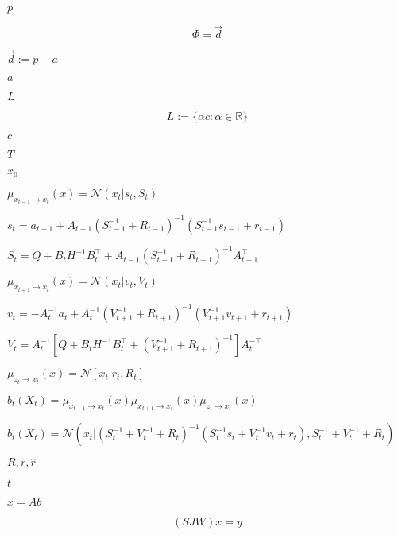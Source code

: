 \documentclass{article}
\begin{document}
$p$
\pagebreak

\[ \Phi = \vec{d} \]
\pagebreak

$\vec{d}:=p - a$
\pagebreak

$a$
\pagebreak

$L$
\pagebreak

\[ L:=\{\alpha c : \alpha\in\mathbb{R}\} \]
\pagebreak

$c$
\pagebreak

$T$
\pagebreak

$x_0$
\pagebreak

$ \mu_{x_{t-1}\rightarrow x_t}(x)=\mathcal{N}(x_t|s_t,S_t) $
\pagebreak

$ s_t=a_{t-1}\!+\!A_{t-1}(S_{t-1}^{-1}\!+\!R_{t-1})^{-1}(S_{t-1}^{-1}s_{t-1}\!+\!r_{t-1}) $
\pagebreak

$ S_t=Q+B_tH^{-1}B_t^{\!\top\!} + A_{t-1}(S_{t-1}^{-1}+R_{t-1})^{-1}A_{t-1}^{\!\top\!} $
\pagebreak

$ \mu_{x_{t+1}\rightarrow x_t}(x)=\mathcal{N}(x_t|v_t,V_t) $
\pagebreak

$ v_t=-A_{t}^{-1}a_{t}\!\!+\!\!A_{t}^{-1}(V_{t+1}^{-1}\!\!+\!\!R_{t+1})^{-1}(V_{t+1}^{-1}v_{t+1}\!\!+\!\!r_{t+1}) $
\pagebreak

$ V_t=A_{t}^{-1}[Q+B_tH^{-1}B_t^{\!\top\!} + (V_{t+1}^{-1}+R_{t+1})^{-1}]A_{t}^{-{\!\top\!}} $
\pagebreak

$ \mu_{z_t\rightarrow x_t}(x)=\mathcal{N}[x_t|r_t,R_t] $
\pagebreak

$ b_t(X_t)=\mu_{x_{t-1}\rightarrow x_t}(x) \mu_{x_{t+1}\rightarrow x_t}(x) \mu_{z_t\rightarrow x_t}(x) $
\pagebreak

$ b_t(X_t)=\mathcal{N}\left(x_t|(S_t^{-1}+V_t^{-1}+R_t)^{-1}(S_t^{-1}s_t+V_t^{-1}v_t+r_t),S_t^{-1}+V_t^{-1}+R_t \right) $
\pagebreak

$ R, r, \hat{r} $
\pagebreak

$t$
\pagebreak

$x=Ab$
\pagebreak

\[ (SJW)x=y \]
\pagebreak
\end{document}
